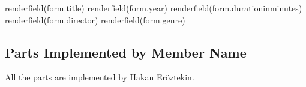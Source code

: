 \documentclass[letterpaper,10pt,english]{sphinxmanual}
\begin{document}
\begin{sphinxVerbatim}[commandchars=\\\{\}]
 
       \PYGZob{}\PYGZob{} render\PYGZus{}field(form.title) \PYGZcb{}\PYGZcb{}
       \PYGZob{}\PYGZob{} render\PYGZus{}field(form.year) \PYGZcb{}\PYGZcb{}
       \PYGZob{}\PYGZob{} render\PYGZus{}field(form.duration\PYGZus{}in\PYGZus{}minutes) \PYGZcb{}\PYGZcb{}
       \PYGZob{}\PYGZob{} render\PYGZus{}field(form.director) \PYGZcb{}\PYGZcb{}
       \PYGZob{}\PYGZob{} render\PYGZus{}field(form.genre) \PYGZcb{}\PYGZcb{}
       
\end{sphinxVerbatim}


\subsection{Parts Implemented by Member Name}
\label{\detokenize{developer/member1:parts-implemented-by-member-name}}\label{\detokenize{developer/member1::doc}}
All the parts are implemented by Hakan Eröztekin.



\renewcommand{\indexname}{Index}
\printindex
\end{document}
